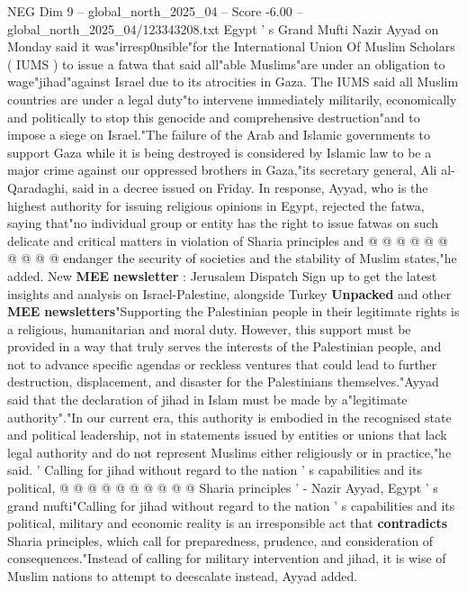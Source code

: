 \begin{textsample}{NEG Dim 9 – global\_north\_2025\_04 – Score -6.00 – global\_north\_2025\_04/123343208.txt}  \label{ex:f9_neg_030}
Egypt ' s Grand Mufti Nazir Ayyad on Monday said it was"irresp0nsible"for the International Union Of Muslim Scholars ( IUMS ) to issue a fatwa that said all"able Muslims"are under an obligation to wage"jihad"against Israel due to its atrocities in Gaza.
The IUMS said all Muslim countries are under a legal duty"to intervene immediately militarily, economically and politically to stop this genocide and comprehensive destruction"and to impose a siege on Israel."The failure of the Arab and Islamic governments to support Gaza while it is being destroyed is considered by Islamic law to be a major crime against our oppressed brothers in Gaza,"its secretary general, Ali al-Qaradaghi, said in a decree issued on Friday.
In response, Ayyad, who is the highest authority for issuing religious opinions in Egypt, rejected the fatwa, saying that"no individual group or entity has the right to issue fatwas on such delicate and critical matters in violation of Sharia principles and @ @ @ @ @ @ @ @ @ @ endanger the security of societies and the stability of Muslim states,"he added.
New \textbf{MEE} \textbf{newsletter} : Jerusalem Dispatch Sign up to get the latest insights and analysis on Israel-Palestine, alongside Turkey \textbf{Unpacked} and other \textbf{MEE} \textbf{newsletters}"Supporting the Palestinian people in their legitimate rights is a religious, humanitarian and moral duty.
However, this support must be provided in a way that truly serves the interests of the Palestinian people, and not to advance specific agendas or reckless ventures that could lead to further destruction, displacement, and disaster for the Palestinians themselves."Ayyad said that the declaration of jihad in Islam must be made by a"legitimate authority"."In our current era, this authority is embodied in the recognised state and political leadership, not in statements issued by entities or unions that lack legal authority and do not represent Muslims either religiously or in practice,"he said. ' Calling for jihad without regard to the nation ' s capabilities and its political, @ @ @ @ @ @ @ @ @ @ Sharia principles ' - Nazir Ayyad, Egypt ' s grand mufti"Calling for jihad without regard to the nation ' s capabilities and its political, military and economic reality is an irresponsible act that \textbf{contradicts} Sharia principles, which call for preparedness, prudence, and consideration of consequences."Instead of calling for military intervention and jihad, it is wise of Muslim nations to attempt to deescalate instead, Ayyad added.

\end{textsample}
